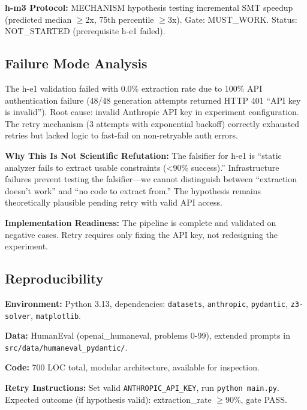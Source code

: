 \textbf{h-m3 Protocol:} MECHANISM hypothesis testing incremental SMT speedup (predicted median $\geq$2x, 75th percentile $\geq$3x). Gate: MUST\_WORK. Status: NOT\_STARTED (prerequisite h-e1 failed).

\subsection{Failure Mode Analysis}

The h-e1 validation failed with 0.0\% extraction rate due to 100\% API authentication failure (48/48 generation attempts returned HTTP 401 ``API key is invalid''). Root cause: invalid Anthropic API key in experiment configuration. The retry mechanism (3 attempts with exponential backoff) correctly exhausted retries but lacked logic to fast-fail on non-retryable auth errors.

\textbf{Why This Is Not Scientific Refutation:} The falsifier for h-e1 is ``static analyzer fails to extract usable constraints (<90\% success).'' Infrastructure failures prevent testing the falsifier---we cannot distinguish between ``extraction doesn't work'' and ``no code to extract from.'' The hypothesis remains theoretically plausible pending retry with valid API access.

\textbf{Implementation Readiness:} The pipeline is complete and validated on negative cases. Retry requires only fixing the API key, not redesigning the experiment.

\subsection{Reproducibility}

\textbf{Environment:} Python 3.13, dependencies: \texttt{datasets}, \texttt{anthropic}, \texttt{pydantic}, \texttt{z3-solver}, \texttt{matplotlib}.

\textbf{Data:} HumanEval (openai\_humaneval, problems 0-99), extended prompts in \texttt{src/data/humaneval\_pydantic/}.

\textbf{Code:} 700 LOC total, modular architecture, available for inspection.

\textbf{Retry Instructions:} Set valid \texttt{ANTHROPIC\_API\_KEY}, run \texttt{python main.py}. Expected outcome (if hypothesis valid): extraction\_rate $\geq$90\%, gate PASS.
